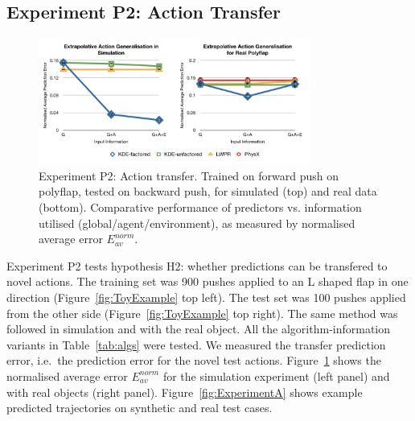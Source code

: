 \subsection{Experiment P2: Action Transfer}
\label{sec:Results.Action}

\begin{figure}[t]
\centerline{\includegraphics[width=0.8\textwidth]{graphs_jw/P2-graphs}}
\caption{Experiment P2: Action transfer. Trained on forward push on polyflap, tested on backward push, for simulated (top) and real data (bottom). Comparative performance of predictors vs. information utilised (global/agent/environment),
as measured by normalised average error ${E_{av}^{norm}}$.
}\label{fig:A_av_graphs}
\end{figure}

Experiment P2 tests hypothesis H2: whether predictions can be
transfered to novel actions.  The training set was 900 pushes applied to an L shaped flap in one direction (Figure~\ref{fig:ToyExample} top
left).  The test set was 100 pushes applied from the other side (Figure~\ref{fig:ToyExample} top right). The same method was followed in simulation and with the real object. All the algorithm-information variants in Table~\ref{tab:algs} were tested. We measured the transfer prediction error, i.e.\ the prediction error for the novel test actions. Figure~\ref{fig:A_av_graphs} %
shows the normalised average error $E_{av}^{norm}$ for the simulation experiment (left panel) and with real objects (right panel).
Figure~\ref{fig:ExperimentA} shows example predicted trajectories on
synthetic and real test cases.

